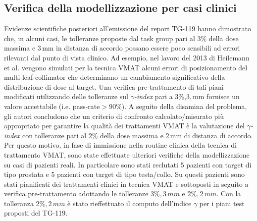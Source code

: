 \subsection{Verifica della modellizzazione per casi clinici}
Evidenze scientifiche posteriori all'emissione del report TG-119 hanno dimostrato che, in alcuni casi, le tolleranze proposte dal task group pari al 3\% della dose massima e $3\,$mm in distanza di accordo possano essere poco sensibili ad errori rilevanti dal punto di vista clinico. Ad esempio, nel lavoro del 2013 di Heilemann et al.\cite{Heilemann2013} vengono simulati per la tecnica VMAT alcuni errori di posizionamento del multi-leaf-collimator che determinano un cambiamento significativo della distribuzione di dose al target. Una verifica pre-trattamento di tali piani modificati utilizzando delle tolleranze sul $\gamma$\textit{-index} pari a 3\%,$3,$mm fornisce un valore accettabile (i.e. pass-rate$> 90\%$). A seguito della disamina del problema, gli autori concludono che un criterio di confronto calcolato/misurato più appropriato per garantire la qualità dei trattamenti VMAT è la valutazione del $\gamma$\textit{-index} con tolleranze pari al $2\%$ della dose massima e $2\,$mm di distanza di accordo. Per questo motivo, in fase di immissione nella routine clinica della tecnica di trattamento VMAT, sono state effettuate ulteriori verifiche della modellizzazione su casi di pazienti reali. In particolare sono stati reclutati 5 pazienti con target di tipo prostata e 5 pazienti con target di tipo testa/collo. Su questi pazienti sono stati pianificati dei trattamenti clinici in tecnica VMAT e sottoposti in seguito a verifica pre-trattamento adottando le tolleranze $3\%,3\,mm$ e $2\%,2\,mm$. Con la tolleranza $2\%,2\,mm$ è stato rieffettuato il computo dell'indice $\gamma$ per i piani test proposti del TG-119.

